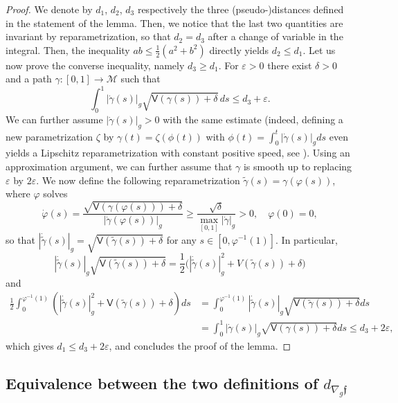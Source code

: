 \documentclass[JEP,XML,SOM,Unicode]{cedram}
\theoremstyle{definition}
\newcommand{\M}{\ensuremath{\mathcal M}}
\newcommand{\f}{\ensuremath{\mathfrak{f}}}
\newcommand\bnp{\begin{proof}}
\newcommand\enp{\end{proof}}
\newcommand\nablag{\nabla_{g}}
\let\e\varepsilon
\let\eps\varepsilon
\begin{document}
\bnp
We denote by $d_1$, $d_2$, $d_3$ respectively the three (pseudo-)distances defined in the statement of the lemma.
Then, we notice that the last two quantities are invariant by reparametrization, so that $d_2=d_3$ after a change of variable in the integral. Then, the inequality $ab\leq \frac{1}{2}(a^2+b^2)$ directly yields $d_2\leq d_1$. Let us now prove the converse inequality, namely $d_3 \geq d_1$. For $\e>0$ there exist $\delta>0$ and a path $\gamma:[0,1]\to \M$ such that\vspace*{-3pt}
\[
\int_0^1 |\dot{\gamma}(s)|_g\sqrt{\mathsf{V}(\gamma(s))+\delta} \, ds\leq d_{3}+\e.
\]
We can further assume $|\dot{\gamma}(s)|_g>0$ with the same estimate (indeed, defining a new parametrization $\zeta$ by $\gamma(t) = \zeta(\phi(t))$ with $\phi(t) = \int_0^t |\dot{\gamma}(s)|_g ds$ even yields a Lipschitz reparametrization with constant positive speed, see \eg \cite[Proof of Lem.\,3.16]{BarilariAgrachevBoscainBook:20}). Using an approximation argument, we can further assume that $\gamma$ is smooth up to replacing $\e$ by $2\eps$.
We now define the following reparametrization $\widetilde{\gamma}(s)=\gamma(\varphi(s))$, where $\varphi$ solves\vspace*{-3pt}
\[
\dot{\varphi}(s)=\frac{\sqrt{\mathsf{V}(\gamma(\varphi(s)))+\delta}}{|\dot{\gamma}(\varphi(s))|_g}\geq \frac{\sqrt{\delta}}{\max_{[0,1]} |\dot{\gamma}|_g}>0,\quad \varphi(0)=0,
\]
so that $|\dot{\widetilde{\gamma}}(s)|_g=\sqrt{\mathsf{V}(\widetilde{\gamma}(s))+\delta} $ for any $s\in [0,\varphi^{-1}(1)]$. In particular,
\[
|\dot{\widetilde{\gamma}}(s)|_g\sqrt{\mathsf{V}(\widetilde{\gamma}(s))+\delta}=\frac12\bigl(|\dot{\widetilde{\gamma}}(s)|_g^2+V(\widetilde{\gamma}(s))+\delta\bigr)
\]
and\vspace*{-3pt}
\begin{align*}
\frac12 \int_0^{\varphi^{-1}(1)}\left(|\dot{\widetilde{\gamma}}(s)|_g^2+\mathsf{V}(\widetilde{\gamma}(s))+\delta\right) ds
& = \int_0^{\varphi^{-1}(1)} |\dot{\widetilde{\gamma}}(s)|_g\sqrt{\mathsf{V}(\widetilde{\gamma}(s))+\delta} ds \\
&=\int_0^1 |\dot{\gamma}(s)|_g\sqrt{\mathsf{V}(\gamma(s))+\delta} ds\leq d_{3}+2\e,
\end{align*}
which gives $d_1\leq d_3+2\e$, and concludes the proof of the lemma.
\enp

\subsection{Equivalence between the two definitions of $d_{\nablag \f}$}
\end{document}
